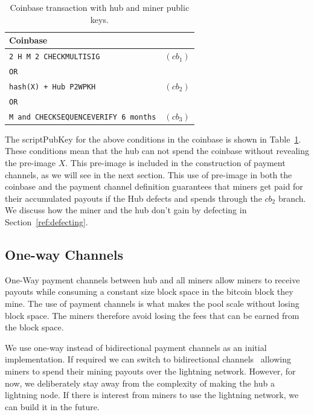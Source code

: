 \documentclass{article}
\begin{document}
\begin{table}
  \centering
  \begin{tabular}{ lr }
    \bfseries Coinbase \\
    \midrule
    \verb|2 H M 2 CHECKMULTISIG| & $(cb_1)$ \\
    \verb|OR| \\
    \verb|hash(X) + Hub P2WPKH| & $(cb_2)$ \\
    \verb|OR| \\
    \verb|M and CHECKSEQUENCEVERIFY 6 months| & $(cb_3)$\\ 
    \midrule
  \end{tabular}
  \caption{Coinbase transaction with hub and miner public keys.}\label{table:coinbase}
\end{table}

The scriptPubKey for the above conditions in the coinbase is shown in
Table~\ref{table:coinbase}. These conditions mean that the hub can not
spend the coinbase without revealing the pre-image $X$. This pre-image
is included in the construction of payment channels, as we will see in
the next section. This use of pre-image in both the coinbase and the
payment channel definition guarantees that miners get paid for their
accumulated payouts if the Hub defects and spends through the $cb_2$
branch. We discuss how the miner and the hub don't gain by defecting
in Section~\ref{ref:defecting}.

\subsection{One-way Channels}

One-Way payment channels between hub and all miners allow miners to
receive payouts while consuming a constant size block space in the
bitcoin block they mine. The use of payment channels is what makes the
pool scale without losing block space. The miners therefore avoid
losing the fees that can be earned from the block space.


We use one-way instead of bidirectional payment channels as an initial
implementation. If required we can switch to bidirectional
channels~\cite{poon2016bitcoin} allowing miners to spend their mining
payouts over the lightning network. However, for now, we deliberately
stay away from the complexity of making the hub a lightning node. If
there is interest from miners to use the lightning network, we can
build it in the future.
\end{document}
